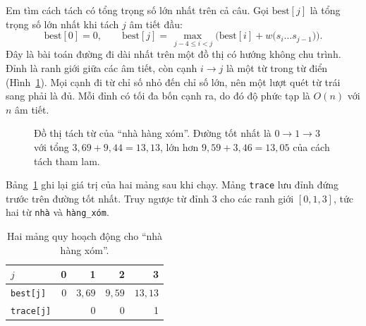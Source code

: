 \documentclass[9pt,twocolumn,a4paper]{extarticle}
\newcommand{\code}[1]{\texttt{#1}}
\begin{document}
Em tìm cách tách có tổng trọng số lớn nhất trên cả câu. Gọi $\text{best}[j]$ là tổng trọng số lớn nhất khi tách $j$ âm tiết đầu:
\begin{equation}
\text{best}[0]=0,\qquad
\text{best}[j]=\max_{\,j-4\le i<j}\Big(\text{best}[i]+w\big(s_i\dots s_{j-1}\big)\Big).
\label{eq:dp}
\end{equation}
Đây là bài toán đường đi dài nhất trên một đồ thị có hướng không chu trình. Đỉnh là ranh giới giữa các âm tiết, còn cạnh $i\to j$ là một từ trong từ điển (Hình~\ref{fig:dag}). Mọi cạnh đi từ chỉ số nhỏ đến chỉ số lớn, nên một lượt quét từ trái sang phải là đủ. Mỗi đỉnh có tối đa bốn cạnh ra, do đó độ phức tạp là $O(n)$ với $n$ âm tiết.

\begin{figure}[H]
\centering
{}
\caption{Đồ thị tách từ của ``nhà hàng xóm''. Đường tốt nhất là $0\to1\to3$ với tổng $3{,}69+9{,}44=13{,}13$, lớn hơn $9{,}59+3{,}46=13{,}05$ của cách tách tham lam.}
\label{fig:dag}
\end{figure}

Bảng~\ref{tab:dptrace} ghi lại giá trị của hai mảng sau khi chạy. Mảng \code{trace} lưu đỉnh đứng trước trên đường tốt nhất. Truy ngược từ đỉnh 3 cho các ranh giới $[0,1,3]$, tức hai từ \code{nhà} và \code{hàng\_xóm}.

\begin{table}[H]
\centering
\caption{Hai mảng quy hoạch động cho ``nhà hàng xóm''.}
\label{tab:dptrace}
\footnotesize
\begin{tabular}{@{}lrrrr@{}}
\toprule
$j$ & 0 & 1 & 2 & 3 \\
\midrule
\code{best[j]} & 0 & $3{,}69$ & $9{,}59$ & $13{,}13$ \\
\code{trace[j]} & & 0 & 0 & 1 \\
\bottomrule
\end{tabular}
\end{table}
\end{document}
